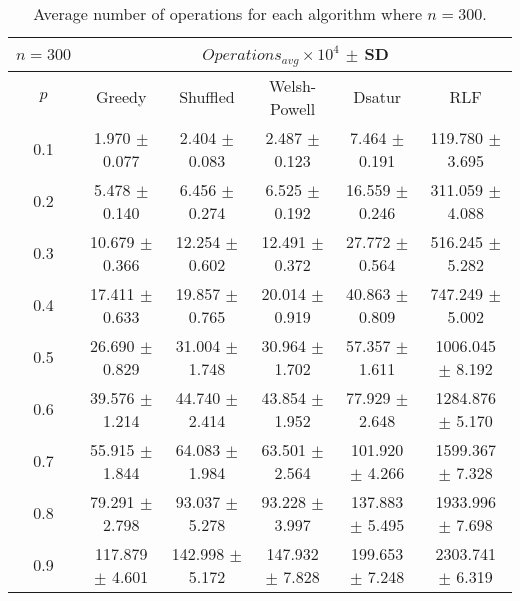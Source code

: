 \begin{table}[H]
    \centering
    \begin{tabular}{cccccc}
        
        $n = 300$& \multicolumn{5}{c}{$Operations_{avg}\times10^4$ $\pm$ SD} \\
        \hline
        $p$ & Greedy & Shuffled & Welsh-Powell & Dsatur & RLF \\
        \hline
        0.1 & 1.970 $\pm$ 0.077 & 2.404 $\pm$ 0.083 & 2.487 $\pm$ 0.123 & 7.464 $\pm$ 0.191 & 119.780 $\pm$ 3.695 \\
        0.2 & 5.478 $\pm$ 0.140 & 6.456 $\pm$ 0.274 & 6.525 $\pm$ 0.192 & 16.559 $\pm$ 0.246 & 311.059 $\pm$ 4.088 \\
        0.3 & 10.679 $\pm$ 0.366 & 12.254 $\pm$ 0.602 & 12.491 $\pm$ 0.372 & 27.772 $\pm$ 0.564 & 516.245 $\pm$ 5.282 \\
        0.4 & 17.411 $\pm$ 0.633 & 19.857 $\pm$ 0.765 & 20.014 $\pm$ 0.919 & 40.863 $\pm$ 0.809 & 747.249 $\pm$ 5.002 \\
        0.5 & 26.690 $\pm$ 0.829 & 31.004 $\pm$ 1.748 & 30.964 $\pm$ 1.702 & 57.357 $\pm$ 1.611 & 1006.045 $\pm$ 8.192 \\
        0.6 & 39.576 $\pm$ 1.214 & 44.740 $\pm$ 2.414 & 43.854 $\pm$ 1.952 & 77.929 $\pm$ 2.648 & 1284.876 $\pm$ 5.170 \\
        0.7 & 55.915 $\pm$ 1.844 & 64.083 $\pm$ 1.984 & 63.501 $\pm$ 2.564 & 101.920 $\pm$ 4.266 & 1599.367 $\pm$ 7.328 \\
        0.8 & 79.291 $\pm$ 2.798 & 93.037 $\pm$ 5.278 & 93.228 $\pm$ 3.997 & 137.883 $\pm$ 5.495 & 1933.996 $\pm$ 7.698 \\
        0.9 & 117.879 $\pm$ 4.601 & 142.998 $\pm$ 5.172 & 147.932 $\pm$ 7.828 & 199.653 $\pm$ 7.248 & 2303.741 $\pm$ 6.319 \\
        \hline
    \end{tabular}
    \caption{Average number of operations for each algorithm where $n = 300$.}
    \label{tab:avgOpsforV300}
\end{table}

